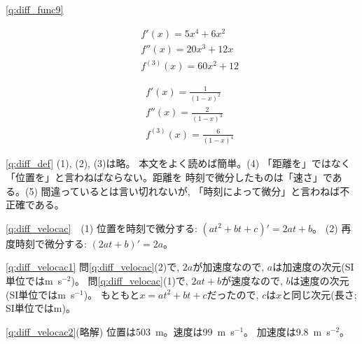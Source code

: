 \ref{q:diff_func9}
\begin{edaenumerate}
\item
\begin{eqnarray*}
&&f'(x)=5x^4+6x^2\\
&&f''(x)=20x^3+12x\\
&&f^{(3)}(x)=60x^2+12
\end{eqnarray*}
\item
\begin{eqnarray*}
&&f'(x)=\frac{1}{(1-x)^2}\\
&&f''(x)=\frac{2}{(1-x)^3}\\
&&f^{(3)}(x)=\frac{6}{(1-x)^4}
\end{eqnarray*}
\end{edaenumerate}


\ref{q:diff_def} (1), (2), (3)は略。
本文をよく読めば簡単。(4) 「距離を」ではなく「位置を」と言わねばならない。距離を
時刻で微分したものは「速さ」である。(5) 間違っているとは言い切れないが, 
「時刻によって微分」と言わねば不正確である。\mv

\ref{q:diff_velocac}　(1) 位置を時刻で微分する: $(at^2+bt+c)'=2at+b$。
(2) 再度時刻で微分する: $(2at+b)'=2a$。\mv

\ref{q:diff_velocac1} 
問\ref{q:diff_velocac}(2)で, $2a$が加速度なので, $a$は加速度の次元(SI単位ではm~s$^{-2}$)。
問\ref{q:diff_velocac}(1)で, $2at+b$が速度なので, $b$は速度の次元(SI単位ではm~s$^{-1}$)。
もともと$x=at^2+bt+c$だったので, $c$は$x$と同じ次元(長さ; SI単位ではm)。\mv

\ref{q:diff_velocac2}(略解) 位置は503~m。速度は99~m~s$^{-1}$。
加速度は9.8~m~s$^{-2}$。\mv


